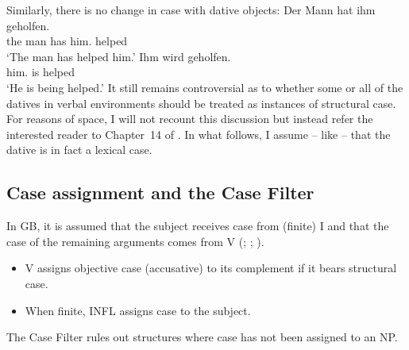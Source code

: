 Similarly, there is no change in case with dative objects:
\eal
\ex 
\gll Der Mann hat ihm geholfen.\\
	 the man has him.\dat{} helped\\
\glt `The man has helped him.'
\ex 
\gll Ihm wird geholfen.\\
	 him.\dat{} is helped\\
\glt `He is being helped.'
\zl
It still remains controversial as to whether some or all of the datives in verbal environments should be treated as instances of structural case.
For reasons of space, I will not recount this discussion but instead refer the interested reader to Chapter~14 of .
In what follows, I assume -- like \citet[]{Haider86} -- that the dative is in fact a lexical case. 



\subsection{Case assignment and the Case Filter}
\label{sec-case-assignment}

In GB, it is assumed that the subject receives case from (finite) I and
that the case of the remaining arguments comes from
V (\citealp[]{Chomsky81a}; \citealp[]{Haider84b}; \citealp[--73]{FF87}). 
\begin{principle-break}\label{Kasusprinzip-GB}
\begin{itemize}
\item V assigns objective case (accusative) to its complement if it bears structural case.
\item When finite, INFL assigns case to the subject.
\end{itemize}
\end{principle-break}
The Case Filter rules out structures where case has not been assigned to an NP.

